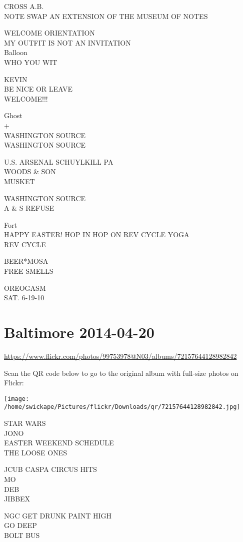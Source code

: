 \documentclass[10pt,letterpaper]{article}
\begin{document}
CROSS A.B.\\
NOTE SWAP AN EXTENSION OF THE MUSEUM OF NOTES

WELCOME ORIENTATION\\
MY OUTFIT IS NOT AN INVITATION\\
Balloon\\
WHO YOU WIT

KEVIN\\
BE NICE OR LEAVE\\
WELCOME!!!

Ghost\\
+\\
WASHINGTON SOURCE\\
WASHINGTON SOURCE

U.S. ARSENAL SCHUYLKILL PA\\
WOODS \& SON\\
MUSKET

WASHINGTON SOURCE\\
A \& S REFUSE

Fort\\
HAPPY EASTER! HOP IN HOP ON REV CYCLE YOGA\\
REV CYCLE

BEER*MOSA\\
FREE SMELLS

OREOGASM\\
SAT. 6{-}19{-}10
\pagebreak

\section*{Baltimore 2014-04-20}

\url{https://www.flickr.com/photos/99753978@N03/albums/72157644128982842}

Scan the QR code below to go to the original album with full-size photos on Flickr:

\texttt{[image: /home/swickape/Pictures/flickr/Downloads/qr/72157644128982842.jpg]}
\pagebreak

STAR WARS\\
JONO\\
EASTER WEEKEND SCHEDULE\\
THE LOOSE ONES

JCUB CASPA CIRCUS HITS\\
MO\\
DEB\\
JIBBEX

NGC GET DRUNK PAINT HIGH\\
GO DEEP\\
BOLT BUS
\end{document}
